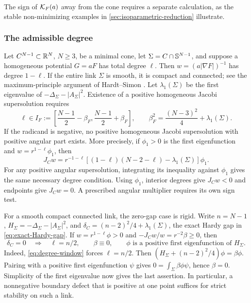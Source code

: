 The sign of \(\mathcal K_F(a)\) away from the cone requires a separate
calculation, as the stable non-minimizing examples in
\cref{sec:isoparametric-reduction} illustrate.

\subsubsection*{The admissible degree}

Let \(C^{N-1}\subset\mathbb R^N\), \(N\geq3\), be a minimal cone, let
\(\Sigma=C\cap\mathbb S^{N-1}\), and suppose a homogeneous potential \(G=aF\)
has total degree \(\ell\).  Then \(w=(a|\nabla F|)^{-1}\) has degree
\(1-\ell\).  If the entire link \(\Sigma\) is smooth, it is compact
and connected; see the maximum-principle argument of Hardt--Simon
\cite[p.~104]{HardtSimon85}.
Let \(\lambda_1(\Sigma)\) be the first eigenvalue of
\(-\Delta_\Sigma-|A_\Sigma|^2\).  Existence of
a positive homogeneous Jacobi supersolution requires
\begin{equation}\label{eq:degree-window}
 \ell\in I_F:=
 \left[\frac{N-1}{2}-\beta_F,
       \frac{N-1}{2}+\beta_F\right],
 \qquad
 \beta_F^2=\frac{(N-3)^2}{4}+\lambda_1(\Sigma).
\end{equation}
If the radicand is negative, no positive homogeneous Jacobi supersolution
with positive angular part exists.  More precisely, if \(\phi_1>0\) is the
first eigenfunction and
\(w=r^{1-\ell}\phi_1\), then
\[
 J_Cw=r^{-1-\ell}\left[
 (1-\ell)(N-2-\ell)-\lambda_1(\Sigma)
 \right]\phi_1.
\]
For any positive angular supersolution, integrating its inequality
against \(\phi_1\) gives the same necessary degree condition.
Using \(\phi_1\), interior degrees give \(J_Cw<0\) and endpoints
give \(J_Cw=0\). A prescribed angular multiplier requires its own sign test.

For a smooth compact connected link, the zero-gap case is rigid.
Write $n=N-1$, $H_\Sigma=-\Delta_\Sigma-|A_\Sigma|^2$, and
$\delta_C=(n-2)^2/4+\lambda_1(\Sigma)$, the exact Hardy gap in
\eqref{eq:exact-Hardy-gap}. If $w=r^{1-\ell}\phi>0$ and
$-J_Cw/w=r^{-2}\beta\ge0$, then
\begin{equation}\label{eq:critical-boundary-rigidity}
 \delta_C=0\quad\Longrightarrow\quad
 \ell=n/2,\qquad \beta\equiv0,\qquad
 \phi\text{ is a positive first eigenfunction of }H_\Sigma.
\end{equation}
Indeed, \eqref{eq:degree-window} forces $\ell=n/2$.
Then $(H_\Sigma+(n-2)^2/4)\phi=\beta\phi$.
Pairing with a positive first eigenfunction $\psi$ gives
$0=\int_\Sigma\beta\phi\psi$, hence $\beta=0$.
Simplicity of the first eigenvalue now gives the last assertion.
In particular, a nonnegative boundary defect that is positive at one
point suffices for strict stability on such a link.

